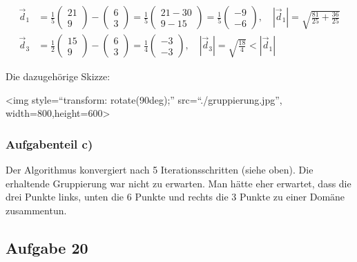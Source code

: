 \documentclass[11pt]{article}
\begin{document}
\[\begin{aligned}
\vec{d}_1 &= \frac{1}{5}\begin{pmatrix} 21 \\ 9 \end{pmatrix} -  \begin{pmatrix} 6 \\ 3 \end{pmatrix} =  \frac{1}{5} \begin{pmatrix} 21 - 30 \\ 9 - 15  \end{pmatrix} = \frac{1}{5}\begin{pmatrix} -9 \\ -6 \end{pmatrix}, \quad \left| \vec{d}_1 \right| = \sqrt{\frac{81}{25} + \frac{36}{25}}  \\
\vec{d}_3 &= \frac{1}{2}\begin{pmatrix} 15 \\ 9 \end{pmatrix} -  \begin{pmatrix} 6 \\ 3 \end{pmatrix} =  \frac{1}{4}\begin{pmatrix} -3 \\ -3 \end{pmatrix}, \quad \left| \vec{d}_3 \right| = \sqrt{\frac{18}{4}} < \left| \vec{d}_1 \right|
\end{aligned}\]

Die dazugehörige Skizze:

     \textless{}img style=``transform: rotate(90deg);''
src=``./gruppierung.jpg'', width=800,height=600\textgreater{} 

    \hypertarget{aufgabenteil-c}{%
\subsubsection{Aufgabenteil c)}\label{aufgabenteil-c}}

Der Algorithmus konvergiert nach 5 Iterationsschritten (siehe oben). Die
erhaltende Gruppierung war nicht zu erwarten. Man hätte eher erwartet,
dass die drei Punkte links, unten die 6 Punkte und rechts die 3 Punkte
zu einer Domäne zusammentun.

    \hypertarget{aufgabe-20}{%
\subsection{Aufgabe 20}\label{aufgabe-20}}
\end{document}
